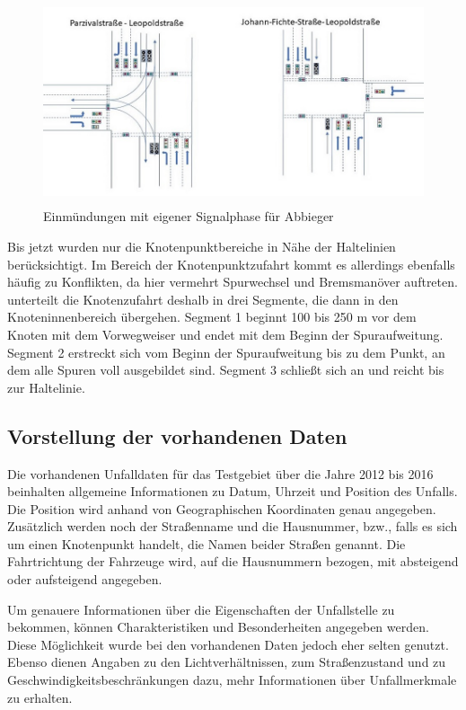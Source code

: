 \begin{savenotes}
	\begin{figure}[H]
		\centering
		\includegraphics[width=12cm,height=6cm]{figures/Einmuendungen_eigene_Phase}
		\caption[Einmündungen mit eigener Signaphase für Abbieger]{Einmündungen mit eigener Signalphase für Abbieger \parencite{Kutsch.05.04.2018}}\label{fig:Einmüngungen_eigene_Phase}
	\end{figure}
\end{savenotes}

Bis jetzt wurden nur die Knotenpunktbereiche in Nähe der Haltelinien berücksichtigt. Im Bereich der Knotenpunktzufahrt kommt es allerdings ebenfalls häufig zu Konflikten, da hier vermehrt Spurwechsel und Bremsmanöver auftreten. \Textcite[S. 19]{Erke.1978} unterteilt die Knotenzufahrt deshalb in drei Segmente, die dann in den Knoteninnenbereich übergehen. Segment 1 beginnt 100 bis 250 m vor dem Knoten mit dem Vorwegweiser und endet mit dem Beginn der Spuraufweitung. Segment 2 erstreckt sich vom Beginn der Spuraufweitung bis zu dem Punkt, an dem alle Spuren voll ausgebildet sind. Segment 3 schließt sich an und reicht bis zur Haltelinie.

\subsection{Vorstellung der vorhandenen Daten}
Die vorhandenen Unfalldaten für das Testgebiet über die Jahre 2012 bis 2016 beinhalten allgemeine Informationen zu Datum, Uhrzeit und Position des Unfalls. Die Position wird anhand von Geographischen Koordinaten genau angegeben. Zusätzlich werden noch der Straßenname und die Hausnummer, bzw., falls es sich um einen Knotenpunkt handelt, die Namen beider Straßen genannt. Die Fahrtrichtung der Fahrzeuge wird, auf die Hausnummern bezogen, mit absteigend oder aufsteigend angegeben.

Um genauere Informationen über die Eigenschaften der Unfallstelle zu bekommen, können Charakteristiken und Besonderheiten angegeben werden. Diese Möglichkeit wurde bei den vorhandenen Daten jedoch eher selten genutzt. Ebenso dienen Angaben zu den Lichtverhältnissen, zum Straßenzustand und zu Geschwindigkeitsbeschränkungen dazu, mehr Informationen über Unfallmerkmale zu erhalten.

